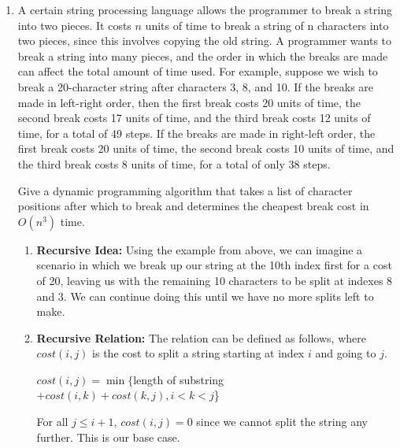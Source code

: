 \documentclass[12pt]{article}
\begin{document}
\begin{enumerate}
    \item A certain string processing language allows the programmer to break
    a string into two pieces. It costs $n$ units of time to break a string of n
    characters into two pieces, since this involves copying the old string. A
    programmer wants to break a string into many pieces, and the order in
    which the breaks are made can affect the total amount of time used. For
    example, suppose we wish to break a 20-character string after characters
    3, 8, and 10. If the breaks are made in left-right order, then the first
    break costs 20 units of time, the second break costs 17 units of time,
    and the third break costs 12 units of time, for a total of 49 steps. If
    the breaks are made in right-left order, the first break costs 20 units
    of time, the second break costs 10 units of time, and the third break
    costs 8 units of time, for a total of only 38 steps.
    
    Give a dynamic programming algorithm that takes a list of character positions
    after which to break and determines the cheapest break cost in $O(n^3)$ time.
    
    \begin{enumerate}
        \item {\bf Recursive Idea:} Using the example from above, we can imagine
        a scenario in which we break up our string at the 10th index first for a
        cost of 20, leaving us with the remaining 10 characters to be split at
        indexes 8 and 3. We can continue doing this until we have no more
        splits left to make.

        \item {\bf Recursive Relation:} The relation can be defined as follows,
        where \\$cost(i,j)$ is the cost to split a string starting at index $i$ and
        going to $j$.
        
        $cost(i,j) = \min \{$length of substring$ + cost(i,k) + cost(k,j), i < k < j$\}

        For all $j \leq i+1$, $cost(i,j) = 0$ since we cannot split the string
        any further. This is our base case.


\end{enumerate}
\end{enumerate}
\end{document}
